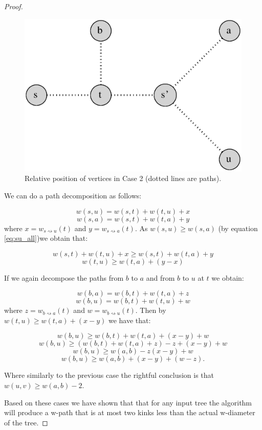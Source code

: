 \begin{proof}
\begin{figure}[h]%
    \centering
    \includegraphics[center, scale=0.4 ]{./images/2xbfs-case-2.eps}
    \caption{Relative position of vertices in Case 2 (dotted lines are paths). }%
    \label{fig:case2}%
\end{figure}


We can do a path decomposition as follows:

$$ w(s, u) = w(s, t) + w(t, u) + x $$
$$ w(s, a) = w(s, t) + w(t, a) + y $$
where $x = w_{s \rightsquigarrow u}(t)$ and $y = w_{s \rightsquigarrow a}(t)$. As $w(s, u) \ge w(s, a)$ (by equation \ref{eq:su_all})we obtain that:

$$ w(s, t) + w(t, u) + x  \ge w(s, t) + w(t, a) + y $$
$$ w(t, u) \ge w(t, a) + (y - x) $$

If we again decompose the paths from $b$ to $a$ and from $b$ to $u$ at $t$ we obtain:

$$ w(b, a) = w(b, t) + w(t, a) + z  $$
$$ w(b, u) = w(b, t) + w(t, u) + w  $$
where $z = w_{b \rightsquigarrow a}(t)$ and $w = w_{b \rightsquigarrow u}(t)$. Then by $w(t, u) \ge w(t, a) + (x - y)$ we have that:

$$ w(b, u) \ge w(b, t) + w(t, a) + (x - y) + w $$
$$ w(b, u) \ge (w(b, t) + w(t, a) + z) - z + (x - y) + w $$
$$ w(b, u) \ge w(a, b) - z (x - y) + w $$
$$ w(b, u) \ge w(a, b) + (x - y) + (w - z). $$

Where similarly to the previous case the rightful conclusion is that $ w(u, v) \ge w(a, b) - 2 $.

Based on these cases we have shown that that for any input tree the algorithm will produce a w-path that is at most two kinks less than the actual w-diameter of the tree.

\end{proof}


